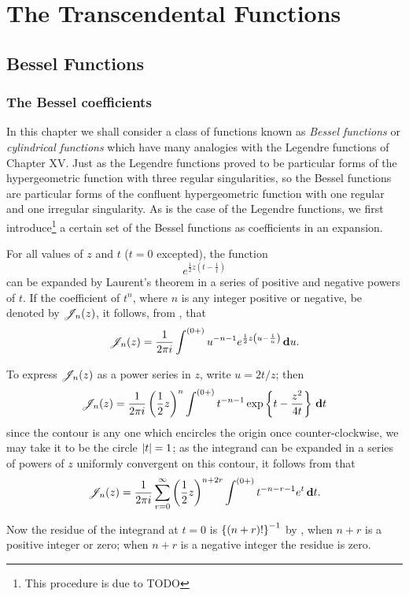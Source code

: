 \documentclass{book}
\begin{document}
\part{The Transcendental Functions}
\chapter{Bessel Functions}
\section{The Bessel coefficients}
In this chapter we shall consider a class of functions known as  \emph{Bessel functions}
or \emph{cylindrical functions}
which have many analogies with the Legendre functions of  Chapter XV.
Just as the Legendre functions proved to be particular forms of the
hypergeometric function with three regular singularities,  so the
Bessel functions are particular forms of the  confluent
hypergeometric function with one regular and one irregular
singularity. As is the case of the Legendre functions, we first
introduce\footnote{This procedure is due to TODO \Schlomilch}
a certain set of the Bessel functions as coefficients in an
expansion.

For all values of $z$ and $t$ ($t=0$ excepted), the function
$$
e^{ \frac{1}{2} z \left( t - \frac{1}{t} \right)}
$$
can be expanded by Laurent's theorem in a series of positive and
negative powers of $t$. If the coefficient of $t^n$, where $n$ is any
integer positive or negative, be denoted by $\mathscr{J}_n(z)$, it follows, from 
, that 
$$
\mathscr{J}_n(z) = \frac{1}{2\pi i} \int^{(0+)} u^{-n-1} e^{\frac{1}{2} z \left( u
    - \frac{1}{u} \right)} \, \mathbf{d} u.
$$

To express $\mathscr{J}_n(z)$ as a power series in $z$, write $u = 2t/z$; then
$$
\mathscr{J}_n(z) = \frac{1}{2\pi i} \left( \frac{1}{2} z  \right)^n \int^{(0+)} t^{-n-1}
\exp \left\{  t - \frac{z^2}{4t}   \right\} \, \mathbf{d} t
$$
since the contour is any one which encircles the origin once 
counter-clockwise, we may take it to be the circle 
$\left| t \right|=1$; as the integrand can be expanded in a series of powers
of $z$ uniformly convergent on this contour, it follows from
 that 
$$
\mathscr{J}_n(z)
=
\frac{1}{2\pi i}
\sum_{r=0}^{\infty} \left( \frac{1}{2} z \right)^{n+2r} 
\int^{(0+)} t^{-n-r-1} e^t \, \mathbf{d} t.
$$

Now the residue of the integrand at $t=0$ is 
$\left\{  (n+r)!   \right\}^{-1}$ by 
, when $n+r$ is a positive 
integer or zero; when $n+r$ is a negative integer 
the residue is zero.
\end{document}
